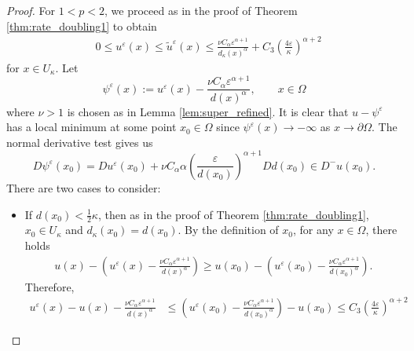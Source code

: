 \documentclass[12pt,reqno]{amsart}
\numberwithin{figure}{section}
\theoremstyle{plain}
\theoremstyle{remark}
\numberwithin{equation}{section}
\begin{document}
\begin{proof} For $1<p<2$, we proceed as in the proof of Theorem \ref{thm:rate_doubling1} to obtain 
\begin{align}
    &0\leq u^\varepsilon(x) \leq \tilde{u}^\varepsilon(x)  \leq \frac{\nu C_\alpha\varepsilon^{\alpha+1}}{d_\kappa(x)^{\alpha}} + C_3\left(\frac{4\varepsilon}{\kappa}\right)^{\alpha+2} \label{annulus2a}
\end{align}
for $x\in U_\kappa$. Let
\begin{equation*}
    \psi^\varepsilon(x) := u^\varepsilon(x) - \frac{\nu C_\alpha \varepsilon^{\alpha+1}}{d(x)^\alpha}, \qquad x\in \Omega
\end{equation*}
where $\nu > 1$ is chosen as in Lemma \ref{lem:super_refined}. It is clear that $u-\psi^\varepsilon$ has a local minimum at some point $x_0\in \Omega$ since $\psi^\varepsilon(x)\to -\infty$ as $x\to \partial\Omega$. The normal derivative test gives us 
\begin{equation*}
    D\psi^\varepsilon(x_0) = Du^\varepsilon(x_0) + \nu C_\alpha\alpha \left(\frac{\varepsilon}{d(x_0)}\right)^{\alpha+1} D d(x_0) \in D^-u(x_0).
\end{equation*}
There are two cases to consider:
\begin{itemize}
    \item If $\displaystyle d(x_0)< \frac{1}{2}\kappa$, then as in the proof of Theorem \ref{thm:rate_doubling1}, $x_0\in U_\kappa$ and $d_\kappa(x_0) = d(x_0)$. By the definition of $x_0$, for any $x\in \Omega$, there holds
    \begin{align*}
        u(x) - \left(u^\varepsilon(x) - \frac{\nu C_\alpha \varepsilon^{\alpha+1}}{d(x)^\alpha}\right) \geq u(x_0) - \left(u^\varepsilon(x_0) - \frac{\nu C_\alpha \varepsilon^{\alpha+1}}{d(x_0)^\alpha}\right).
    \end{align*}
    Therefore,
    \begin{equation*}
    \begin{split}
        u^\varepsilon(x) - u(x) - \frac{\nu C_\alpha \varepsilon^{\alpha+1}}{d(x)^\alpha} &\leq  \left(u^\varepsilon(x_0) - \frac{\nu C_\alpha \varepsilon^{\alpha+1}}{d(x_0)^\alpha}\right) - u(x_0) \leq C_3 \left(\frac{4\varepsilon}{\kappa}\right)^{\alpha+2}
    \end{split}
    \end{equation*}

\end{itemize}
\end{proof}
\end{document}

